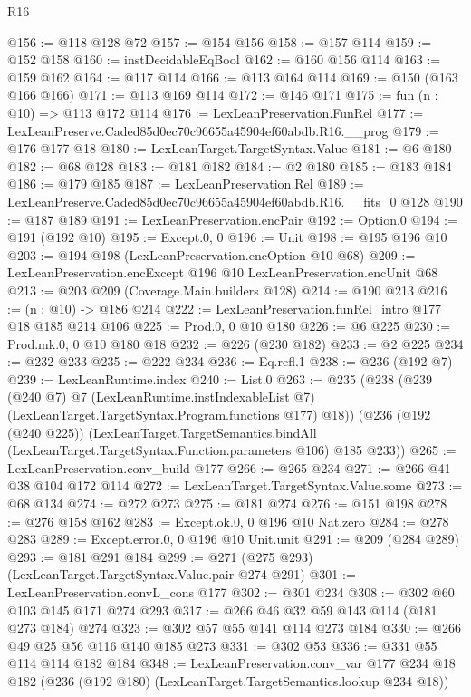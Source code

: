 \begin{lexlean}{R16}
\begin{coremodule}
@156 := @118 @128 @72
@157 := @154 @156
@158 := @157 @114
@159 := @152 @158
@160 := instDecidableEqBool
@162 := @160 @156 @114
@163 := @159 @162
@164 := @117 @114
@166 := @113 @164 @114
@169 := @150 (@163 @166 @166)
@171 := @113 @169 @114
@172 := @146 @171
@175 := fun (n : @10) => @113 @172 @114
@176 := LexLeanPreservation.FunRel
@177 := LexLeanPreserve.Caded85d0ec70c96655a45904ef60abdb.R16.__prog
@179 := @176 @177 @18
@180 := LexLeanTarget.TargetSyntax.Value
@181 := @6 @180
@182 := @68 @128
@183 := @181 @182
@184 := @2 @180
@185 := @183 @184
@186 := @179 @185
@187 := LexLeanPreservation.Rel
@189 := LexLeanPreserve.Caded85d0ec70c96655a45904ef60abdb.R16.__fits_0 @128
@190 := @187 @189
@191 := LexLeanPreservation.encPair
@192 := Option.{0}
@194 := @191 (@192 @10)
@195 := Except.{0, 0}
@196 := Unit
@198 := @195 @196 @10
@203 := @194 @198 (LexLeanPreservation.encOption @10 @68)
@209 := LexLeanPreservation.encExcept @196 @10 LexLeanPreservation.encUnit @68
@213 := @203 @209 (Coverage.Main.builders @128)
@214 := @190 @213
@216 := (n : @10) -> @186 @214
@222 := LexLeanPreservation.funRel_intro @177 @18 @185 @214 @106
@225 := Prod.{0, 0} @10 @180
@226 := @6 @225
@230 := Prod.mk.{0, 0} @10 @180 @18
@232 := @226 (@230 @182)
@233 := @2 @225
@234 := @232 @233
@235 := @222 @234
@236 := Eq.refl.{1}
@238 := @236 (@192 @7)
@239 := LexLeanRuntime.index
@240 := List.{0}
@263 := @235
    (@238
      (@239
        (@240 @7)
        @7
        (LexLeanRuntime.instIndexableList @7)
        (LexLeanTarget.TargetSyntax.Program.functions @177)
        @18))
    (@236
      (@192 (@240 @225))
      (LexLeanTarget.TargetSemantics.bindAll
        (LexLeanTarget.TargetSyntax.Function.parameters @106)
        @185
        @233))
@265 := LexLeanPreservation.conv_build @177
@266 := @265 @234
@271 := @266 @41 @38 @104 @172 @114
@272 := LexLeanTarget.TargetSyntax.Value.some
@273 := @68 @134
@274 := @272 @273
@275 := @181 @274
@276 := @151 @198
@278 := @276 @158 @162
@283 := Except.ok.{0, 0} @196 @10 Nat.zero
@284 := @278 @283
@289 := Except.error.{0, 0} @196 @10 Unit.unit
@291 := @209 (@284 @289)
@293 := @181 @291 @184
@299 := @271 (@275 @293) (LexLeanTarget.TargetSyntax.Value.pair @274 @291)
@301 := LexLeanPreservation.convL_cons @177
@302 := @301 @234
@308 := @302 @60 @103 @145 @171 @274 @293
@317 := @266 @46 @32 @59 @143 @114 (@181 @273 @184) @274
@323 := @302 @57 @55 @141 @114 @273 @184
@330 := @266 @49 @25 @56 @116 @140 @185 @273
@331 := @302 @53
@336 := @331 @55 @114 @114 @182 @184
@348 := LexLeanPreservation.conv_var
    @177
    @234
    @18
    @182
    (@236 (@192 @180) (LexLeanTarget.TargetSemantics.lookup @234 @18))

\end{coremodule}
\end{lexlean}
